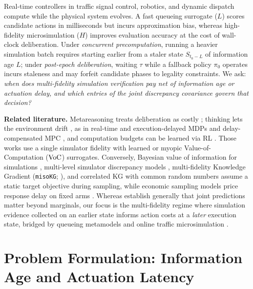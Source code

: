 Real-time controllers in traffic signal control, robotics, and dynamic dispatch compute while the physical system evolves. A fast queueing surrogate ($L$) scores candidate actions in milliseconds but incurs approximation bias, whereas high-fidelity microsimulation ($H$) improves evaluation accuracy at the cost of wall-clock deliberation. Under \emph{concurrent precomputation}, running a heavier simulation batch requires starting earlier from a staler state $S_{t_0 - L}$ of information age $L$; under \emph{post-epoch deliberation}, waiting $\tau$ while a fallback policy $\pi_0$ operates incurs staleness and may forfeit candidate phases to legality constraints. We ask: \emph{when does multi-fidelity simulation verification pay net of information age or actuation delay, and which entries of the joint discrepancy covariance govern that decision?}

\textbf{Related literature.}
Metareasoning treats deliberation as costly \citep{russell1991principles,hansen2001monitoring}; thinking lets the environment drift \citep{lin2015metareasoning}, as in real-time and execution-delayed MDPs \citep{ramstedt2019realtime,derman2021delayed} and delay-compensated MPC \citep{findeisen2004delay}, and computation budgets can be learned via RL \citep{magnino2026learning,muppidi2026time}. Those works use a single simulator fidelity with learned or myopic Value-of-Computation ($\operatorname{VoC}$) surrogates. Conversely, Bayesian value of information for simulations \citep{hay2012selecting}, multi-level simulator discrepancy models \citep{kennedy2000predicting,kennedy2001bayesian}, multi-fidelity Knowledge Gradient (\texttt{misoKG}; \citealp{poloczek2017miso}), and correlated KG with common random numbers \citep{frazier2009knowledge,xie2016pairwise} assume a static target objective during sampling, while economic sampling models price response delay on fixed arms \citep{chick2012sequential,chick2017delayed}. Whereas \citet{wen2021predictions} establish generally that joint predictions matter beyond marginals, our focus is the multi-fidelity regime where simulation evidence collected on an earlier state informs action costs at a \emph{later} execution state, bridged by queueing metamodels \citep{osorio2013simulation} and online traffic microsimulation \citep{goodall2013traffic}.

\section{Problem Formulation: Information Age and Actuation Latency}

